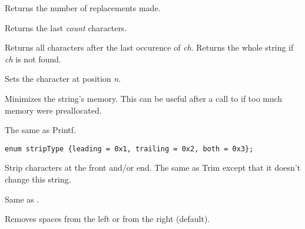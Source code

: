 {Returns the number of replacements made.

\label{wxstringright}


Returns the last {\it count} characters.


Returns all characters after the last occurence of {\it ch}.
Returns the whole string if {\it ch} is not found.

\label{wxstringsetchar}


Sets the character at position {\it n}.

\label{wxstringshrink}


Minimizes the string's memory. This can be useful after a call to 
 if too much memory were preallocated.

\label{wxstringsprintf}


The same as Printf.

\label{wxstringstrip}

\begin{verbatim}
enum stripType {leading = 0x1, trailing = 0x2, both = 0x3};
\end{verbatim}


Strip characters at the front and/or end. The same as Trim except that it
doesn't change this string.

\label{wxstringsubstring}


Same as .

\label{wxstringtrim}


Removes spaces from the left or from the right (default).

}
